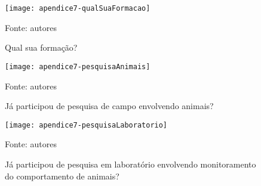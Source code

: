 \begin{figure}[ht]
  \centering
    \caption{Qual sua formação?}
    \texttt{[image: apendice7-qualSuaFormacao]}
	\centerline{\small{Fonte: autores}}
\end{figure}
\FloatBarrier

\begin{figure}[ht]
  \centering
    \caption{Já participou de pesquisa de campo envolvendo animais?}
    \texttt{[image: apendice7-pesquisaAnimais]}
	\centerline{\small{Fonte: autores}}
\end{figure}
\FloatBarrier

\begin{figure}[ht]
  \centering
    \caption{Já participou de pesquisa em laboratório envolvendo monitoramento do comportamento de animais?}
    \texttt{[image: apendice7-pesquisaLaboratorio]}
	\centerline{\small{Fonte: autores}}
\end{figure}
\FloatBarrier
